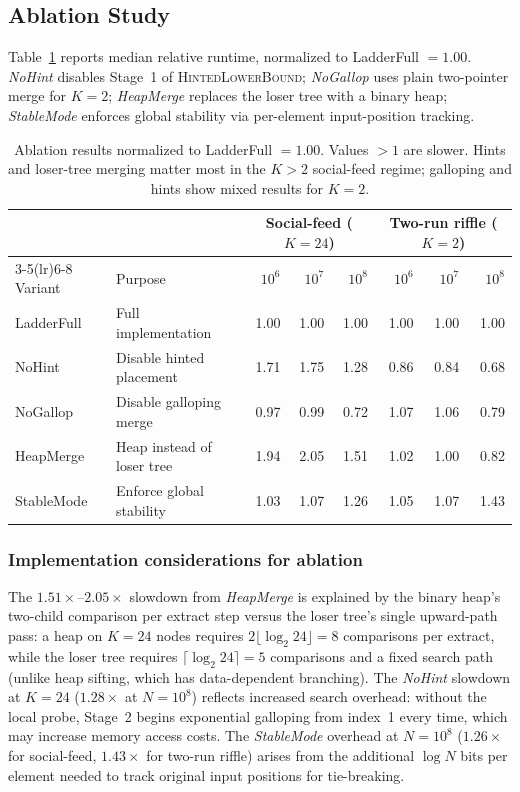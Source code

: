 \documentclass{ieeeaccess}
\theoremstyle{plain}
\theoremstyle{definition}
\begin{document}
\subsection{Ablation Study}
\label{sec:ablation}

Table~\ref{tab:phase4-ablation} reports median relative runtime, normalized
to LadderFull $= 1.00$.  \emph{NoHint} disables Stage~1 of
\textsc{HintedLowerBound}; \emph{NoGallop} uses plain two-pointer merge for
$K=2$; \emph{HeapMerge} replaces the loser tree with a binary heap;
\emph{StableMode} enforces global stability via per-element input-position tracking.

\begin{table}[t]
\centering\small
\caption{Ablation results normalized to LadderFull $= 1.00$.  Values $> 1$
  are slower.  Hints and loser-tree merging matter most in the $K > 2$
  social-feed regime; galloping and hints show mixed results for $K=2$.}
\label{tab:phase4-ablation}
\begin{tabularx}{\linewidth}{@{}lXrrrrrr@{}}
\toprule
& & \multicolumn{3}{c}{Social-feed ($K=24$)} & \multicolumn{3}{c}{Two-run riffle ($K=2$)} \\
\cmidrule(lr){3-5}\cmidrule(lr){6-8}
Variant & Purpose & $10^6$ & $10^7$ & $10^8$ & $10^6$ & $10^7$ & $10^8$ \\
\midrule
LadderFull & Full implementation      & 1.00 & 1.00 & 1.00 & 1.00 & 1.00 & 1.00 \\
NoHint     & Disable hinted placement & 1.71 & 1.75 & 1.28 & 0.86 & 0.84 & 0.68 \\
NoGallop   & Disable galloping merge  & 0.97 & 0.99 & 0.72 & 1.07 & 1.06 & 0.79 \\
HeapMerge  & Heap instead of loser tree & 1.94 & 2.05 & 1.51 & 1.02 & 1.00 & 0.82 \\
StableMode & Enforce global stability  & 1.03 & 1.07 & 1.26 & 1.05 & 1.07 & 1.43 \\
\bottomrule
\end{tabularx}
\end{table}

\subsubsection{Implementation considerations for ablation}
The $1.51\times$--$2.05\times$ slowdown from \emph{HeapMerge} is explained by
the binary heap's two-child comparison per extract step versus the loser
tree's single upward-path pass: a heap on $K=24$ nodes requires
$2\lfloor\log_2 24\rfloor = 8$ comparisons per extract, while the loser tree
requires $\lceil\log_2 24\rceil = 5$ comparisons and a fixed search path (unlike
heap sifting, which has data-dependent branching). The \emph{NoHint} slowdown at $K=24$ ($1.28\times$
at $N=10^8$) reflects increased search overhead: without the local probe, Stage~2
begins exponential galloping from index~1 every time, which may increase memory
access costs. The \emph{StableMode} overhead at $N=10^8$
($1.26\times$ for social-feed, $1.43\times$ for two-run riffle) arises from
the additional $\log N$ bits per element needed to track original input positions
for tie-breaking.
\end{document}
